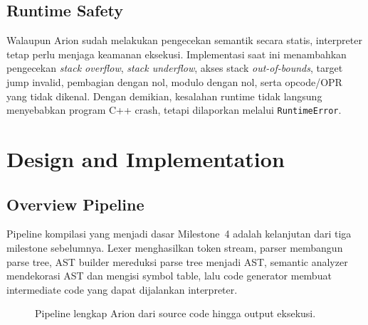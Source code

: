 \documentclass[11pt,a4paper]{article}
\begin{document}
\subsection{Runtime Safety}

Walaupun Arion sudah melakukan pengecekan semantik secara statis, interpreter
tetap perlu menjaga keamanan eksekusi. Implementasi saat ini menambahkan
pengecekan \textit{stack overflow}, \textit{stack underflow}, akses stack
\textit{out-of-bounds}, target jump invalid, pembagian dengan nol, modulo dengan
nol, serta opcode/OPR yang tidak dikenal. Dengan demikian, kesalahan runtime
tidak langsung menyebabkan program C++ crash, tetapi dilaporkan melalui
\texttt{RuntimeError}.

\section{Design and Implementation}

\subsection{Overview Pipeline}

Pipeline kompilasi yang menjadi dasar Milestone~4 adalah kelanjutan dari tiga
milestone sebelumnya. Lexer menghasilkan token stream, parser membangun parse
tree, AST builder mereduksi parse tree menjadi AST, semantic analyzer
mendekorasi AST dan mengisi symbol table, lalu code generator membuat
intermediate code yang dapat dijalankan interpreter.

\begin{figure}[H]
\centering
{}
\caption{Pipeline lengkap Arion dari source code hingga output eksekusi.}
\label{fig:pipeline}
\end{figure}
\end{document}
